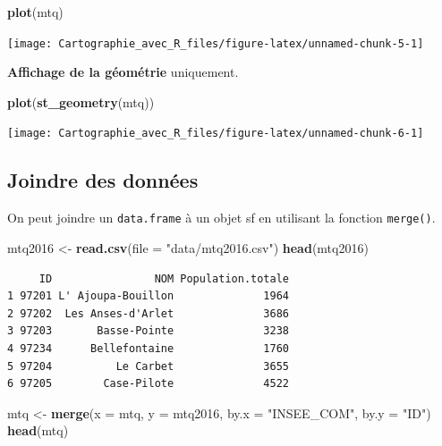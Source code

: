 \documentclass[]{book}
\newenvironment{Shaded}{\begin{snugshade}}{\end{snugshade}}
\newcommand{\KeywordTok}[1]{\textcolor[rgb]{0.13,0.29,0.53}{\textbf{#1}}}
\newcommand{\DataTypeTok}[1]{\textcolor[rgb]{0.13,0.29,0.53}{#1}}
\newcommand{\StringTok}[1]{\textcolor[rgb]{0.31,0.60,0.02}{#1}}
\newcommand{\NormalTok}[1]{#1}
\begin{document}
\begin{Shaded}
\begin{Highlighting}[]
\KeywordTok{plot}\NormalTok{(mtq)}
\end{Highlighting}
\end{Shaded}

\begin{center}\texttt{[image: Cartographie\_avec\_R\_files/figure-latex/unnamed-chunk-5-1]} \end{center}

\textbf{Affichage de la géométrie} uniquement.

\begin{Shaded}
\begin{Highlighting}[]
\KeywordTok{plot}\NormalTok{(}\KeywordTok{st_geometry}\NormalTok{(mtq))}
\end{Highlighting}
\end{Shaded}

\begin{center}\texttt{[image: Cartographie\_avec\_R\_files/figure-latex/unnamed-chunk-6-1]} \end{center}

\subsection{Joindre des données}\label{joindre-des-donnees}

On peut joindre un \texttt{data.frame} à un objet sf en utilisant la
fonction \texttt{merge()}.

\begin{Shaded}
\begin{Highlighting}[]
\NormalTok{mtq2016 <-}\StringTok{ }\KeywordTok{read.csv}\NormalTok{(}\DataTypeTok{file =} \StringTok{"data/mtq2016.csv"}\NormalTok{)}
\KeywordTok{head}\NormalTok{(mtq2016)}
\end{Highlighting}
\end{Shaded}

\begin{verbatim}
     ID                NOM Population.totale
1 97201 L' Ajoupa-Bouillon              1964
2 97202  Les Anses-d'Arlet              3686
3 97203       Basse-Pointe              3238
4 97234      Bellefontaine              1760
5 97204          Le Carbet              3655
6 97205        Case-Pilote              4522
\end{verbatim}

\begin{Shaded}
\begin{Highlighting}[]
\NormalTok{mtq <-}\StringTok{ }\KeywordTok{merge}\NormalTok{(}\DataTypeTok{x =}\NormalTok{ mtq, }\DataTypeTok{y =}\NormalTok{ mtq2016, }\DataTypeTok{by.x =} \StringTok{"INSEE_COM"}\NormalTok{, }\DataTypeTok{by.y =} \StringTok{"ID"}\NormalTok{)}
\KeywordTok{head}\NormalTok{(mtq)}
\end{Highlighting}
\end{Shaded}
\end{document}
